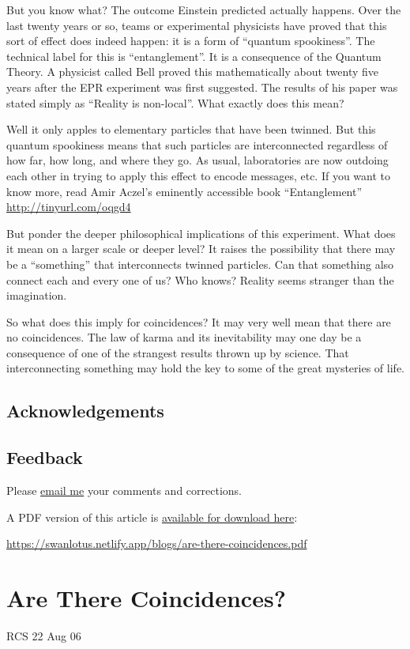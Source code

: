 \documentclass[
  a4paper,
]{article}
\begin{document}
But you know what? The outcome Einstein predicted actually happens. Over
the last twenty years or so, teams or experimental physicists have
proved that this sort of effect does indeed happen: it is a form of
``quantum spookiness''. The technical label for this is
``entanglement''. It is a consequence of the Quantum Theory. A physicist
called Bell proved this mathematically about twenty five years after the
EPR experiment was first suggested. The results of his paper was stated
simply as ``Reality is non-local''. What exactly does this mean?

Well it only apples to elementary particles that have been twinned. But
this quantum spookiness means that such particles are interconnected
regardless of how far, how long, and where they go. As usual,
laboratories are now outdoing each other in trying to apply this effect
to encode messages, etc. If you want to know more, read Amir Aczel's
eminently accessible book ``Entanglement''
\url{http://tinyurl.com/oqgd4}

But ponder the deeper philosophical implications of this experiment.
What does it mean on a larger scale or deeper level? It raises the
possibility that there may be a ``something'' that interconnects twinned
particles. Can that something also connect each and every one of us? Who
knows? Reality seems stranger than the imagination.

So what does this imply for coincidences? It may very well mean that
there are no coincidences. The law of karma and its inevitability may
one day be a consequence of one of the strangest results thrown up by
science. That interconnecting something may hold the key to some of the
great mysteries of life.

\subsection{Acknowledgements}\label{acknowledgements}

\subsection{Feedback}\label{feedback}

Please \href{mailto:feedback.swanlotus@gmail.com}{email me} your
comments and corrections.

\noindent A PDF version of this article is
\href{./are-there-coincidences.pdf}{available for download here}:

\begin{sffamily}

\url{https://swanlotus.netlify.app/blogs/are-there-coincidences.pdf}

\end{sffamily}

\section{Are There Coincidences?}\label{are-there-coincidences}

RCS 22 Aug 06
\end{document}
